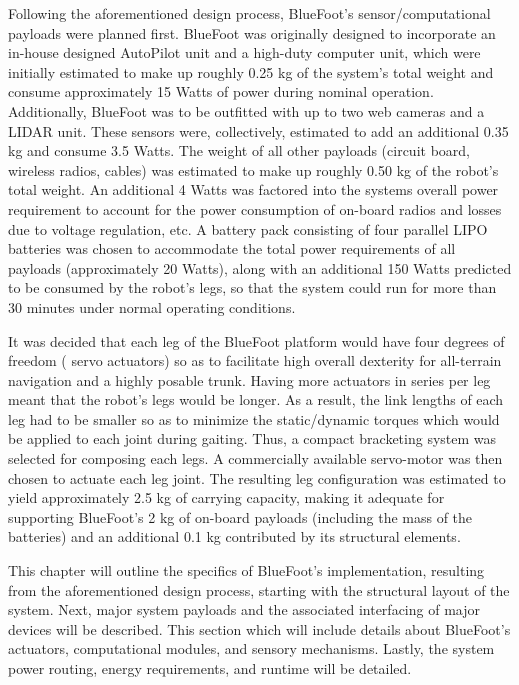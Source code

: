 	Following the aforementioned design process, BlueFoot's sensor/computational payloads were  planned first. BlueFoot was originally designed to incorporate an in-house designed AutoPilot unit and a high-duty computer unit, which were initially estimated to make up roughly 0.25 kg of the system's total weight and consume approximately 15 Watts of power during nominal operation. Additionally, BlueFoot was to be outfitted with up to two web cameras and a LIDAR unit. These sensors were, collectively, estimated to add an additional 0.35 kg and consume 3.5 Watts. The weight of all other payloads (\IE circuit board, wireless radios, cables) was estimated to make up roughly 0.50 kg of the robot's total weight. An additional 4 Watts was factored into the systems overall power requirement to account for the power consumption of on-board radios and losses due to voltage regulation, etc. A battery pack consisting of four parallel LIPO batteries was chosen to accommodate the total power requirements of all payloads (approximately 20 Watts), along with an additional 150 Watts predicted to be consumed by the robot's legs, so that the system could run for more than 30 minutes under normal operating conditions. 

	It was decided that each leg of the BlueFoot platform would have four degrees of freedom ( servo actuators) so as to facilitate high overall dexterity for all-terrain navigation and a highly posable trunk. Having more actuators in series per leg meant that the robot's legs would be longer. As a result, the link lengths of each leg had to be smaller so as to minimize the static/dynamic torques which would be applied to each joint during gaiting. Thus, a compact bracketing system was selected for composing each legs. A commercially available servo-motor was then chosen to actuate each leg joint. The resulting leg configuration was estimated to yield approximately 2.5 kg of carrying capacity, making it adequate for supporting BlueFoot's 2 kg of on-board payloads (including the mass of the batteries) and an additional 0.1 kg contributed by its structural elements.





	This chapter will outline the specifics of BlueFoot's implementation, resulting from the aforementioned design process, starting with the structural layout of the system. Next, major system payloads and the associated interfacing of major devices will be described. This section which will include details about BlueFoot's actuators, computational modules, and sensory mechanisms. Lastly, the system power routing, energy requirements, and runtime will be detailed.

